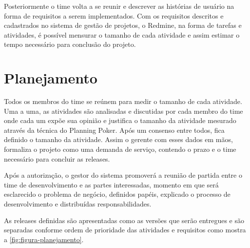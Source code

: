 Posteriormente o time volta a se reunir e descrever as histórias de usuário na forma de requisitos a serem implementados. Com os requisitos descritos e cadastrados no sistema de gestão de projetos, o Redmine, na forma de tarefas e atividades, é possível mensurar o tamanho de cada atividade e assim estimar o tempo necessário para conclusão do projeto.  

\section{Planejamento}
\label{sec:atividadesRealizadasPlanejamento}

Todos os membros do time se reúnem para medir o tamanho de cada atividade. Uma a uma, as atividades são analisadas e discutidas por cada membro do time onde cada um expõe sua opinião e justifica o tamanho da atividade mesurado através da técnica do Planning Poker. Após um consenso entre todos, fica definido o tamanho da atividade. Assim o gerente com esses dados em mãos, formaliza o projeto como uma demanda de serviço, contendo o prazo e o time necessário para concluir as releases.

\begin{citacao}
Após a autorização, o gestor do sistema promoverá a reunião de
partida entre o time de desenvolvimento e as partes interessadas, momento em que será
esclarecido o problema de negócio, definidos papéis, explicado o processo de
desenvolvimento e distribuídas responsabilidades.\cite[p.~2]{Portaria37:2017}
\end{citacao}

As releases definidas são apresentadas como as versões que serão entregues e são separadas conforme ordem de prioridade das atividades e requisitos como mostra a \autoref{fig:figura-planejamento}.


